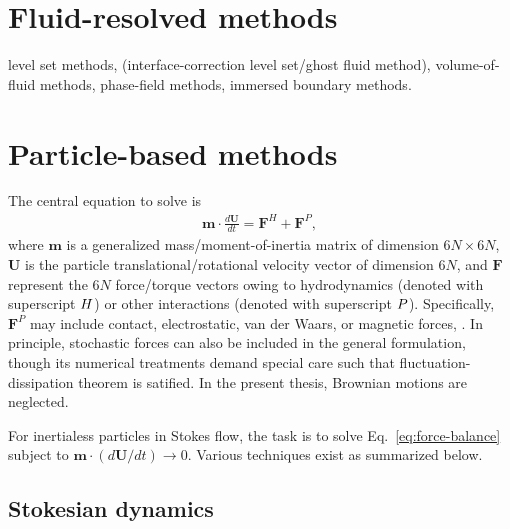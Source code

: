 \section{Fluid-resolved methods}

level set methods,
(interface-correction level set/ghost fluid method),
volume-of-fluid methods,
phase-field methods,
immersed boundary methods.


\section{Particle-based methods}
\label{sec:num-dem}

The central equation to solve is
\begin{equation} 
 \begin{aligned} \label{eq:force-balance}
  {\bm m} \cdot \frac{d{\bm U}}{dt} = {\bm F}^H + {\bm F}^P, 
 \end{aligned}
\end{equation}
where ${\bm m}$ is a generalized mass/moment-of-inertia matrix of dimension $6N \times 6N$,
${\bm U}$ is the particle translational/rotational velocity vector of dimension $6N$,
and ${\bm F}$ represent the $6N$ force/torque vectors owing to hydrodynamics (denoted with superscript $\footnotesize H$) or other interactions (denoted with superscript $\footnotesize P$). Specifically, ${\bm F}^P$ may include contact, electrostatic, van der Waars, or magnetic forces, \etc. In principle, stochastic forces can also be included in the general formulation, though its numerical treatments demand special care such that fluctuation-dissipation theorem is satified. In the present thesis, Brownian motions are neglected.

For inertialess particles in Stokes flow, the task is to solve Eq.\ \eqref{eq:force-balance} subject to ${\bm m} \cdot (d{\bm U}/dt) \to 0$. Various techniques exist as summarized below.

\subsection{Stokesian dynamics}


